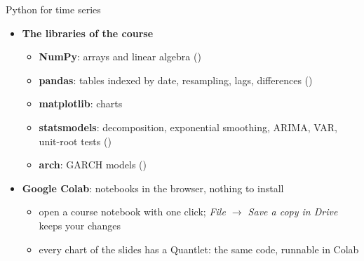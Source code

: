 \begin{frame}{Python for time series}
\itemsize{\small}
\begin{itemize}
    \item \textbf{The libraries of the course}
    \begin{itemize}
        \item \textbf{NumPy}: arrays and linear algebra ()
        \item \textbf{pandas}: tables indexed by date, resampling, lags, differences ()
        \item \textbf{matplotlib}: charts
        \item \textbf{statsmodels}: decomposition, exponential smoothing, ARIMA, VAR, unit-root tests ()
        \item \textbf{arch}: GARCH models ()
    \end{itemize}
    \item \textbf{Google Colab}: notebooks in the browser, nothing to install
    \begin{itemize}
        \item open a course notebook with one click; \emph{File $\to$ Save a copy in Drive} keeps your changes
        \item every chart of the slides has a Quantlet: the same code, runnable in Colab
    \end{itemize}
\end{itemize}
\end{frame}

